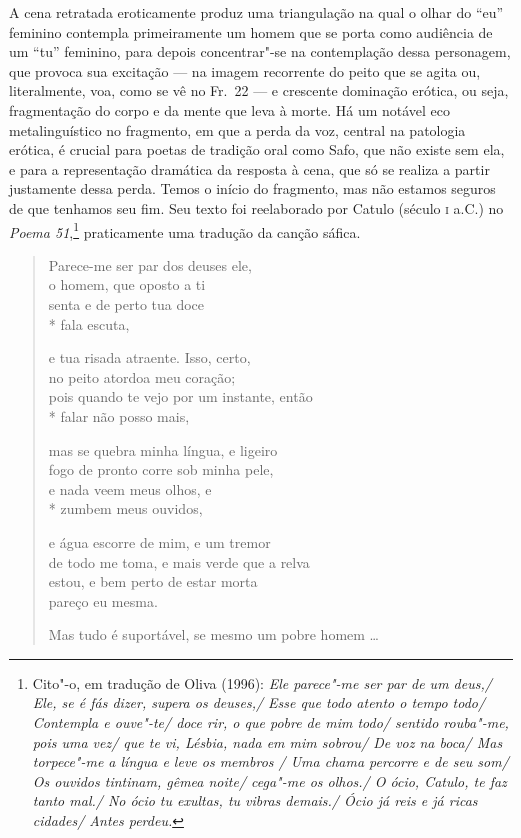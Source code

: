{A cena retratada eroticamente produz uma triangulação na qual o olhar do “eu”
feminino contempla primeiramente um homem que se porta como audiência de um
“tu” feminino, para depois concentrar"-se na contemplação dessa
personagem, que provoca sua excitação --- na imagem recorrente do peito que se agita ou,
literalmente, voa, como se vê no Fr.~22 --- e crescente dominação erótica, ou
seja, fragmentação do corpo e da mente que leva à morte. Há um notável eco
metalinguístico no fragmento, em que a perda da voz, central na patologia
erótica, é crucial para poetas de tradição oral como Safo, que não existe sem
ela, e para a representação dramática da resposta à cena, que só se realiza a
partir justamente dessa perda. Temos o início do fragmento, mas não estamos
seguros de que tenhamos seu fim. Seu texto foi reelaborado por Catulo (século \textsc{i}
a.C.) no \textit{Poema 51},\footnote{ Cito"-o, em tradução de Oliva (1996):
\textit{Ele parece"-me ser par de um deus,/ Ele, se é fás dizer, supera os
deuses,/ Esse que todo atento o tempo todo/ Contempla e ouve"-te/ doce rir, o
que pobre de mim todo/ sentido rouba"-me, pois uma vez/ que te vi, Lésbia,
nada em mim sobrou/ De voz na boca/ Mas torpece"-me a língua e leve os membros
/ Uma chama percorre e de seu som/ Os ouvidos tintinam, gêmea noite/ cega"-me
os olhos./ O ócio, Catulo, te faz tanto mal./ No ócio tu exultas, tu vibras
demais./ Ócio já reis e já ricas cidades/ Antes perdeu.}} praticamente uma
tradução da canção sáfica.}

\begin{verse}
Parece-me ser par dos deuses ele,\\
o homem, que oposto a ti\\
senta e de perto tua doce\\*
fala escuta,

e tua risada atraente. Isso, certo,\\
no peito atordoa meu coração;\\
pois quando te vejo por um instante, então\\*
falar não posso mais,

mas se quebra minha língua, e ligeiro\\
fogo de pronto corre sob minha pele,\\
e nada veem meus olhos, e\\*
zumbem meus ouvidos,

e água escorre de mim, e um tremor\\
de todo me toma, e mais verde que a relva\\
estou, e bem perto de estar morta\\
pareço eu mesma.

Mas tudo é suportável, se mesmo um pobre homem \ldots{}
\end{verse}

